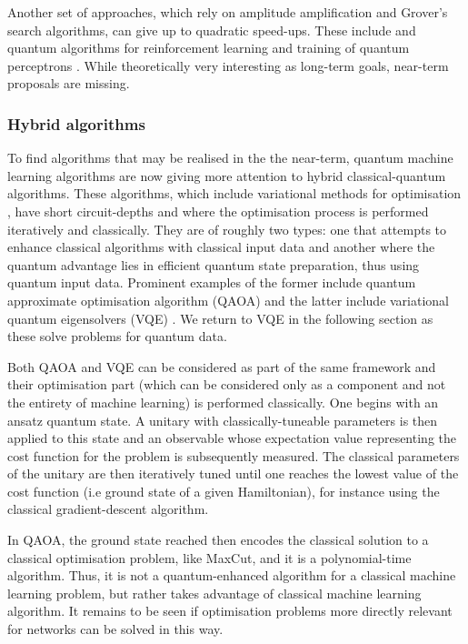 \documentclass[twocolumn, aps, rmp, amsmath, amssymb, nofootinbib, superscriptaddress, longbibliography, floatfix, table-of-contents, eqsecnum]{revtex4-2}
\begin{document}
Another set of approaches, which rely on amplitude amplification and Grover's search algorithms, can give up to quadratic speed-ups. These include and quantum algorithms for reinforcement learning \cite{dunjko2016quantum} and training of quantum perceptrons \cite{kapoor2016quantum}. While theoretically very interesting as long-term goals, near-term proposals are missing.

\subsubsection{Hybrid algorithms}

To find algorithms that may be realised in the the near-term, quantum machine learning algorithms are now giving more attention to hybrid classical-quantum algorithms. These algorithms, which include variational methods for optimisation \cite{moll2018quantum}, have short circuit-depths and where the optimisation process is performed iteratively and classically. They are of roughly two types: one that attempts to enhance classical algorithms with classical input data and another where the quantum advantage lies in efficient quantum state preparation, thus using quantum input data. Prominent examples of the former include quantum approximate optimisation algorithm (QAOA) \cite{farhi2014quantum, farhi2016quantum} and the latter include variational quantum eigensolvers (VQE) \cite{peruzzo2014peruzzo, kandala2017hardware}. We return to VQE in the following section as these solve problems for quantum data.

Both QAOA and VQE can be considered as part of the same framework and their optimisation part (which can be considered only as a component and not the entirety of machine learning) is performed classically. One begins with an ansatz quantum state. A unitary with classically-tuneable parameters is then applied to this state and an observable whose expectation value representing the cost function for the problem is subsequently measured. The classical parameters of the unitary are then iteratively tuned until one reaches the lowest value of the cost function (i.e ground state of a given Hamiltonian), for instance using the classical gradient-descent algorithm. \

In QAOA, the ground state reached then encodes the classical solution to a classical optimisation problem, like MaxCut, and it is a polynomial-time algorithm. Thus, it is not a quantum-enhanced algorithm for a classical machine learning problem, but rather takes advantage of classical machine learning algorithm. It remains to be seen if optimisation problems more directly relevant for networks can be solved in this way.
\end{document}
